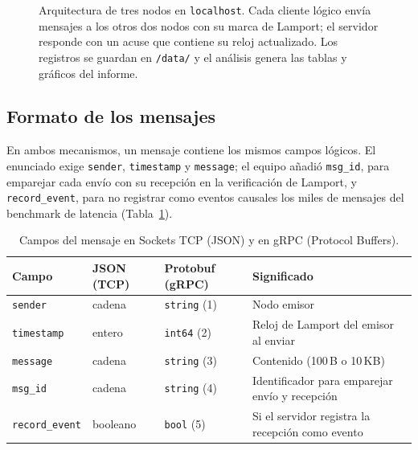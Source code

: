 \documentclass[12pt,a4paper]{article}
\begin{document}
\begin{figure}[htbp]
\caption{Arquitectura de tres nodos en \texttt{localhost}. Cada cliente lógico envía mensajes a los otros dos nodos con su marca de Lamport; el servidor responde con un acuse que contiene su reloj actualizado. Los registros se guardan en \texttt{/data/} y el análisis genera las tablas y gráficos del informe.}
\label{fig:arquitectura}
\end{figure}

\subsection{Formato de los mensajes}

En ambos mecanismos, un mensaje contiene los mismos campos lógicos. El enunciado exige \texttt{sender}, \texttt{timestamp} y \texttt{message}; el equipo añadió \texttt{msg\_id}, para emparejar cada envío con su recepción en la verificación de Lamport, y \texttt{record\_event}, para no registrar como eventos causales los miles de mensajes del benchmark de latencia (Tabla~\ref{tab:campos_mensaje}).

\begin{table}[htbp]
\centering
\caption{Campos del mensaje en Sockets TCP (JSON) y en gRPC (Protocol Buffers).}
\label{tab:campos_mensaje}
\small
\begin{tabular}{llll}
\toprule
Campo & JSON (TCP) & Protobuf (gRPC) & Significado \\
\midrule
\texttt{sender} & cadena & \texttt{string} (1) & Nodo emisor \\
\texttt{timestamp} & entero & \texttt{int64} (2) & Reloj de Lamport del emisor al enviar \\
\texttt{message} & cadena & \texttt{string} (3) & Contenido (100\,B o 10\,KB) \\
\texttt{msg\_id} & cadena & \texttt{string} (4) & Identificador para emparejar envío y recepción \\
\texttt{record\_event} & booleano & \texttt{bool} (5) & Si el servidor registra la recepción como evento \\
\bottomrule
\end{tabular}
\end{table}
\end{document}
